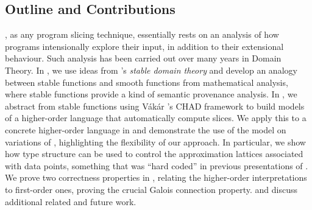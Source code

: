 \subsection{Outline and Contributions}


\GPS, as any program slicing technique, essentially rests on an analysis of how programs intensionally explore their input, in addition to their extensional behaviour. Such analysis has been carried out over many years in Domain Theory. In , we use ideas from \citet{berry79}'s \emph{stable domain theory} and develop an analogy between stable functions and smooth functions from mathematical analysis, where stable functions provide a kind of semantic provenance analysis. In , we abstract from stable functions using V{\'a}k{\'a}r \etal{}'s CHAD framework \cite{vakar22,nunes2023} to build models of a higher-order language that automatically compute slices. We apply this to a concrete higher-order language in  and demonstrate the use of the model on variations of , highlighting the flexibility of our approach. In particular, we show how type structure can be used to control the approximation lattices associated with data points, something that was ``hard coded'' in previous presentations of \GPS. We prove two correctness properties in , relating the higher-order interpretations to first-order ones, proving the crucial Galois connection property.  and  discuss additional related and future work.


